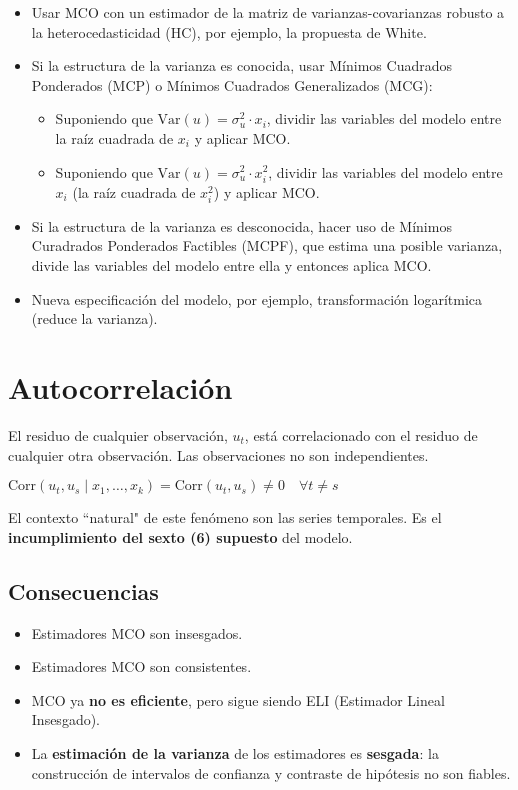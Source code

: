 \documentclass[10pt, a4paper, landscape]{extarticle}
\newcommand{\Var}{\mathrm{Var}}
\newcommand{\Corr}{\mathrm{Corr}}
\begin{document}
\begin{multicols}{3}
\begin{itemize}[leftmargin=*]
	\item Usar MCO con un estimador de la matriz de varianzas-covarianzas robusto a la heterocedasticidad (HC), por ejemplo, la propuesta de White.
	\item Si la estructura de la varianza es conocida, usar Mínimos Cuadrados Ponderados (MCP) o Mínimos Cuadrados Generalizados (MCG):
	\begin{itemize}[leftmargin=*]
		\item Suponiendo que $\Var(u) = \sigma^2_u \cdot x_i$, dividir las variables del modelo entre la raíz cuadrada de $x_i$ y aplicar MCO.
		\item Suponiendo que $\Var(u) = \sigma^2_u \cdot x_i^2$, dividir las variables del modelo entre $x_i$ (la raíz cuadrada de $x_i^2$) y aplicar MCO.
	\end{itemize}
	\item Si la estructura de la varianza es desconocida, hacer uso de Mínimos Curadrados Ponderados Factibles (MCPF), que estima una posible varianza, divide las variables del modelo entre ella y entonces aplica MCO.
	\item Nueva especificación del modelo, por ejemplo, transformación logarítmica (reduce la varianza).
\end{itemize}

\columnbreak

\section*{Autocorrelación}

El residuo de cualquier observación, $u_t$, está correlacionado con el residuo de cualquier otra observación. Las observaciones no son independientes.

\begin{center}
	$\Corr(u_t, u_s \mid x_1, \ldots, x_k) = \Corr(u_t, u_s) \neq 0 \quad \forall t \neq s$
\end{center}

El contexto ``natural" de este fenómeno son las series temporales. Es el \textbf{incumplimiento del sexto (6) supuesto} del modelo.

\subsection*{Consecuencias}

\begin{itemize}[leftmargin=*]
	\item Estimadores MCO son insesgados.
	\item Estimadores MCO son consistentes.
	\item MCO ya \textbf{no es eficiente}, pero sigue siendo ELI (Estimador Lineal Insesgado).
	\item La \textbf{estimación de la varianza} de los estimadores es \textbf{sesgada}: la construcción de intervalos de confianza y contraste de hipótesis no son fiables.
\end{itemize}


\end{multicols}
\end{document}
